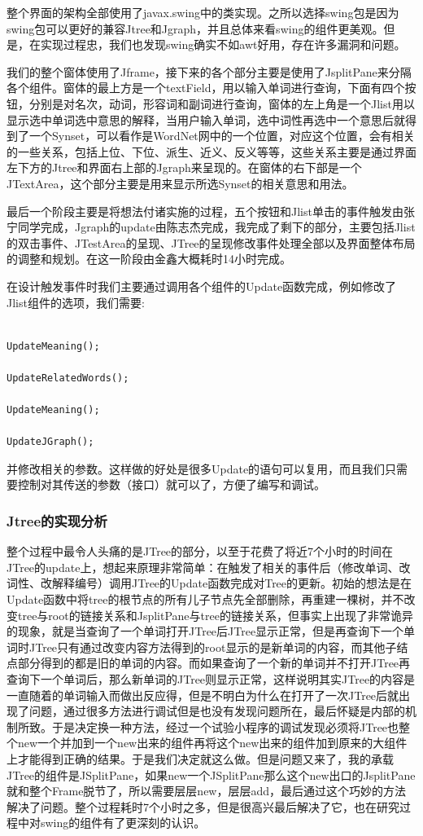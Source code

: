 \documentclass[a4paper,unicode=true,xetex]{article}
\begin{document}
整个界面的架构全部使用了javax.swing中的类实现。之所以选择swing包是因为swing包可以更好的兼容Jtree和Jgraph，并且总体来看swing的组件更美观。但是，在实现过程忠，我们也发现swing确实不如awt好用，存在许多漏洞和问题。

我们的整个窗体使用了Jframe，接下来的各个部分主要是使用了JsplitPane来分隔各个组件。窗体的最上方是一个textField，用以输入单词进行查询，下面有四个按钮，分别是对名次，动词，形容词和副词进行查询，窗体的左上角是一个Jlist用以显示选中单词选中意思的解释，当用户输入单词，选中词性再选中一个意思后就得到了一个Synset，可以看作是WordNet网中的一个位置，对应这个位置，会有相关的一些关系，包括上位、下位、派生、近义、反义等等，这些关系主要是通过界面左下方的Jtree和界面右上部的Jgraph来呈现的。在窗体的右下部是一个JTextArea，这个部分主要是用来显示所选Synset的相关意思和用法。

最后一个阶段主要是将想法付诸实施的过程，五个按钮和Jlist单击的事件触发由张宁同学完成，Jgraph的update由陈志杰完成，我完成了剩下的部分，主要包括Jlist的双击事件、JTestArea的呈现、JTree的呈现修改事件处理全部以及界面整体布局的调整和规划。在这一阶段由金鑫大概耗时14小时完成。

在设计触发事件时我们主要通过调用各个组件的Update函数完成，例如修改了Jlist组件的选项，我们需要:
\begin{lstlisting}

UpdateMeaning();

UpdateRelatedWords();

UpdateMeaning();

UpdateJGraph();
\end{lstlisting}
并修改相关的参数。这样做的好处是很多Update的语句可以复用，而且我们只需要控制对其传送的参数（接口）就可以了，方便了编写和调试。

\subsubsection{Jtree的实现分析}

整个过程中最令人头痛的是JTree的部分，以至于花费了将近7个小时的时间在JTree的update上，想起来原理非常简单：在触发了相关的事件后（修改单词、改词性、改解释编号）调用JTree的Update函数完成对Tree的更新。初始的想法是在Update函数中将tree的根节点的所有儿子节点先全部删除，再重建一棵树，并不改变tree与root的链接关系和JsplitPane与tree的链接关系，但事实上出现了非常诡异的现象，就是当查询了一个单词打开JTree后JTree显示正常，但是再查询下一个单词时JTree只有通过改变内容方法得到的root显示的是新单词的内容，而其他子结点部分得到的都是旧的单词的内容。而如果查询了一个新的单词并不打开JTree再查询下一个单词后，那么新单词的JTree则显示正常，这样说明其实JTree的内容是一直随着的单词输入而做出反应得，但是不明白为什么在打开了一次JTree后就出现了问题，通过很多方法进行调试但是也没有发现问题所在，最后怀疑是内部的机制所致。于是决定换一种方法，经过一个试验小程序的调试发现必须将JTree也整个new一个并加到一个new出来的组件再将这个new出来的组件加到原来的大组件上才能得到正确的结果。于是我们决定就这么做。但是问题又来了，我的承载JTree的组件是JSplitPane，如果new一个JSplitPane那么这个new出口的JsplitPane就和整个Frame脱节了，所以需要层层new，层层add，最后通过这个巧妙的方法解决了问题。整个过程耗时7个小时之多，但是很高兴最后解决了它，也在研究过程中对swing的组件有了更深刻的认识。
\end{document}
